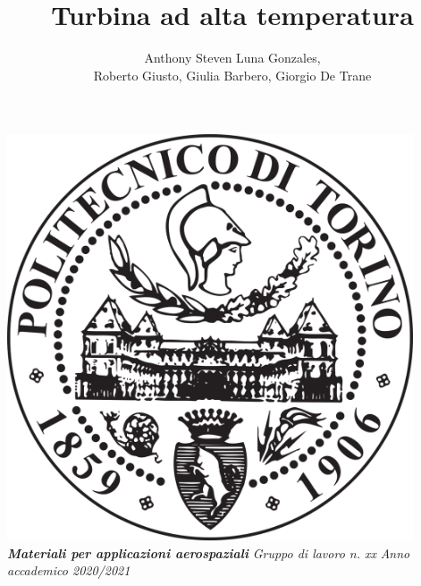\documentclass{article}
\author{Anthony Steven Luna Gonzales, \\Roberto Giusto, Giulia Barbero, Giorgio De Trane}
\title{\textbf{Turbina ad alta temperatura}}
\begin{document}
    \maketitle
    \begin{center}
        \includegraphics[width=0.9\textwidth]{Sources/polito_logo.png}\linebreak\newline
       \textbf{\textit{Materiali per applicazioni aerospaziali}}\linebreak\newline
        \textit{Gruppo di lavoro n. xx}\linebreak\newline
        \textit{Anno accademico 2020/2021}
    \end{center}

    \newpage
\end{document}

